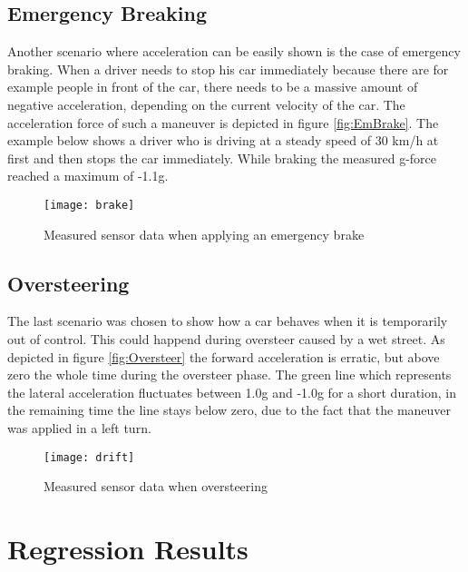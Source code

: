 \subsection{Emergency Breaking}
Another scenario where acceleration can be easily shown is the case of emergency braking. When a driver needs to stop his car immediately because there are for example people in front of the car, there needs to be a massive amount of negative acceleration, depending on the current velocity of the car. The acceleration force of such a maneuver is depicted in figure \vref{fig:EmBrake}. The example below shows a driver who is driving at a steady speed of 30 km/h at first and then stops the car immediately. While braking the measured g-force reached a maximum of -1.1g.

\begin{figure}[H]
    \centering
    \texttt{[image: brake]}
    \caption{Measured sensor data when applying an emergency brake}
    \label{fig:EmBrake}
\end{figure}

\subsection{Oversteering}

The last scenario was chosen to show how a car behaves when it is temporarily out of control. This could happend during oversteer caused by a wet street. As depicted in figure \vref{fig:Oversteer} the forward acceleration is erratic, but above zero the whole time during the oversteer phase. The green line which represents the lateral acceleration fluctuates between 1.0g and -1.0g for a short duration, in the remaining time the line stays below zero, due to the fact that the maneuver was applied in a left turn.

\begin{figure}[H]
    \centering
    \texttt{[image: drift]}
    \caption{Measured sensor data when oversteering}
    \label{fig:Oversteer}
\end{figure}

\section{Regression Results}


